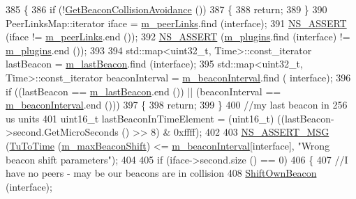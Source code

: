 \begin{DoxyCode}
385 \{
386   \textcolor{keywordflow}{if} (!\hyperlink{classns3_1_1dot11s_1_1PeerManagementProtocol_ac97f472fcc281fb856f8434555cab024}{GetBeaconCollisionAvoidance} ())
387     \{
388       \textcolor{keywordflow}{return};
389     \}
390   PeerLinksMap::iterator iface = \hyperlink{classns3_1_1dot11s_1_1PeerManagementProtocol_aa4522af32720f04cfbb693adb2024c55}{m\_peerLinks}.find (interface);
391   \hyperlink{assert_8h_a6dccdb0de9b252f60088ce281c49d052}{NS\_ASSERT} (iface != \hyperlink{classns3_1_1dot11s_1_1PeerManagementProtocol_aa4522af32720f04cfbb693adb2024c55}{m\_peerLinks}.end ());
392   \hyperlink{assert_8h_a6dccdb0de9b252f60088ce281c49d052}{NS\_ASSERT} (\hyperlink{classns3_1_1dot11s_1_1PeerManagementProtocol_a9000d20f6feb3db279a020b237f49d64}{m\_plugins}.find (interface) != \hyperlink{classns3_1_1dot11s_1_1PeerManagementProtocol_a9000d20f6feb3db279a020b237f49d64}{m\_plugins}.end ());
393 
394   std::map<uint32\_t, Time>::const\_iterator lastBeacon = \hyperlink{classns3_1_1dot11s_1_1PeerManagementProtocol_a8d3adf393b3f4d96d60285132b1004da}{m\_lastBeacon}.find (interface);
395   std::map<uint32\_t, Time>::const\_iterator beaconInterval = \hyperlink{classns3_1_1dot11s_1_1PeerManagementProtocol_a915ce7d45ccdfa57b75bc300745974fa}{m\_beaconInterval}.find (
      interface);
396   \textcolor{keywordflow}{if} ((lastBeacon == \hyperlink{classns3_1_1dot11s_1_1PeerManagementProtocol_a8d3adf393b3f4d96d60285132b1004da}{m\_lastBeacon}.end ()) || (beaconInterval == 
      \hyperlink{classns3_1_1dot11s_1_1PeerManagementProtocol_a915ce7d45ccdfa57b75bc300745974fa}{m\_beaconInterval}.end ()))
397     \{
398       \textcolor{keywordflow}{return};
399     \}
400   \textcolor{comment}{//my last beacon in 256 us units}
401   uint16\_t lastBeaconInTimeElement = (uint16\_t) ((lastBeacon->second.GetMicroSeconds () >> 8) & 0xffff);
402 
403   \hyperlink{assert_8h_aff5ece9066c74e681e74999856f08539}{NS\_ASSERT\_MSG} (\hyperlink{classns3_1_1dot11s_1_1PeerManagementProtocol_adcc7f057f6fa22012b3ee72cf57e2082}{TuToTime} (\hyperlink{classns3_1_1dot11s_1_1PeerManagementProtocol_a23968eb845fa63fe87f303d2e21e77f0}{m\_maxBeaconShift}) <= 
      \hyperlink{classns3_1_1dot11s_1_1PeerManagementProtocol_a915ce7d45ccdfa57b75bc300745974fa}{m\_beaconInterval}[interface], \textcolor{stringliteral}{"Wrong beacon shift parameters"});
404 
405   \textcolor{keywordflow}{if} (iface->second.size () == 0)
406     \{
407       \textcolor{comment}{//I have no peers - may be our beacons are in collision}
408       \hyperlink{classns3_1_1dot11s_1_1PeerManagementProtocol_a9649a96c629c63b98c133fe258340aa9}{ShiftOwnBeacon} (interface);

\end{DoxyCode}
